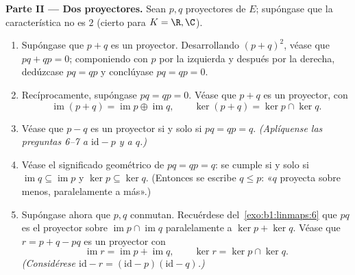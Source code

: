 \begin{problem}
\medskip
\noindent\textbf{Parte II --- Dos proyectores.} Sean $p, q$
proyectores de $E$; supóngase que la característica no es $2$ (cierto
para $K = \R, \C$).
\begin{enumerate}[resume]
  \item Supóngase que $p + q$ es un proyector. Desarrollando
        $(p + q)^2$, véase que $pq + qp = 0$; componiendo con $p$ por
        la izquierda y después por la derecha, dedúzcase $pq = qp$ y
        conclúyase $pq = qp = 0$.
  \item Recíprocamente, supóngase $pq = qp = 0$. Véase que $p + q$ es
        un proyector, con
        \[
        \operatorname{im}(p + q) = \operatorname{im} p \oplus
        \operatorname{im} q,
        \qquad
        \ker(p + q) = \ker p \cap \ker q .
        \]
  \item Véase que $p - q$ es un proyector si y solo si
        $pq = qp = q$. \emph{(Aplíquense las preguntas 6--7 a
        $\mathrm{id} - p$ y a $q$.)}
  \item Véase el significado geométrico de $pq = qp = q$: se cumple
        si y solo si $\operatorname{im} q \subseteq
        \operatorname{im} p$ y $\ker p \subseteq \ker q$. (Entonces
        se escribe $q \leq p$: «$q$ proyecta sobre menos,
        paralelamente a más».)
  \item Supóngase ahora que $p, q$ conmutan. Recuérdese
        del~\cref{exo:b1:linmaps:6} que $pq$ es el proyector sobre
        $\operatorname{im} p \cap \operatorname{im} q$
        paralelamente a $\ker p + \ker q$. Véase que
        $r = p + q - pq$ es un proyector con
        \[
        \operatorname{im} r = \operatorname{im} p +
        \operatorname{im} q,
        \qquad
        \ker r = \ker p \cap \ker q .
        \]
        \emph{(Considérese $\mathrm{id} - r = (\mathrm{id} -
        p)(\mathrm{id} - q)$.)}
\end{enumerate}


\end{problem}
